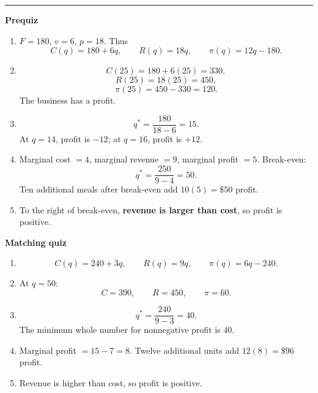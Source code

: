 \documentclass[10pt]{article}
\newcommand{\modulekey}[2]{\clearpage{\Large\bfseries\textcolor{olive}{Module #1: #2 — Answer Key}}\par\textcolor{gold}{\rule{\linewidth}{1.2pt}}\par}
\begin{document}
\modulekey{7}{Cost, Revenue, and Profit}
\textbf{Prequiz}
\begin{enumerate}
\item \(F=180\), \(v=6\), \(p=18\). Thus
\[
C(q)=\boxed{180+6q},\qquad R(q)=\boxed{18q},\qquad \pi(q)=\boxed{12q-180}.
\]
\item
\[
C(25)=180+6(25)=\boxed{330},
\]
\[
R(25)=18(25)=\boxed{450},
\]
\[
\pi(25)=450-330=\boxed{120}.
\]
The business has a profit.
\item
\[
q^*=\frac{180}{18-6}=\boxed{15}.
\]
At \(q=14\), profit is \(-12\); at \(q=16\), profit is \(+12\).
\item Marginal cost \(=\boxed4\), marginal revenue \(=\boxed9\), marginal profit \(=\boxed5\). Break-even:
\[
q^*=\frac{250}{9-4}=\boxed{50}.
\]
Ten additional meals after break-even add \(10(5)=\boxed{\$50}\) profit.
\item To the right of break-even, \textbf{revenue is larger than cost}, so profit is positive.
\end{enumerate}

\textbf{Matching quiz}
\begin{enumerate}
\item
\[
C(q)=\boxed{240+3q},\qquad R(q)=\boxed{9q},\qquad \pi(q)=\boxed{6q-240}.
\]
\item At \(q=50\):
\[
C=\boxed{390},\qquad R=\boxed{450},\qquad \pi=\boxed{60}.
\]
\item
\[
q^*=\frac{240}{9-3}=\boxed{40}.
\]
The minimum whole number for nonnegative profit is \(40\).
\item Marginal profit \(=15-7=\boxed8\). Twelve additional units add \(12(8)=\boxed{\$96}\) profit.
\item Revenue is higher than cost, so profit is positive.
\end{enumerate}
\end{document}
